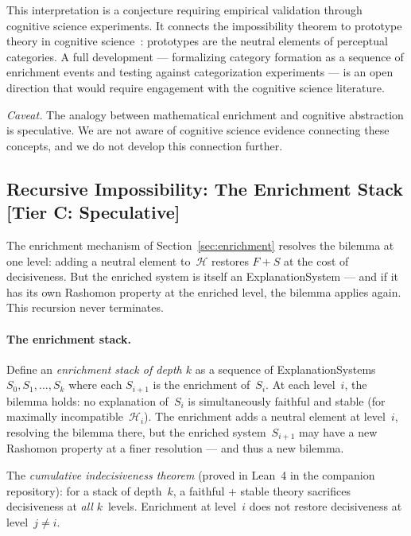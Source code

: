 \documentclass[11pt,a4paper]{article}
\newcommand{\sH}{\mathcal{H}}
\begin{document}
This interpretation is a conjecture requiring empirical validation through cognitive science experiments.  It connects the impossibility theorem to prototype
theory in cognitive science~\citep{rosch1975cognitive}: prototypes are
the neutral elements of perceptual categories.  A full development ---
formalizing category formation as a sequence of enrichment events and
testing against categorization experiments --- is an open direction that
would require engagement with the cognitive science literature.

\smallskip\noindent\emph{Caveat.} The analogy between mathematical enrichment and cognitive abstraction is speculative. We are not aware of cognitive science evidence connecting these concepts, and we do not develop this connection further.

\subsection{Recursive Impossibility: The Enrichment Stack\,\textnormal{\normalsize[Tier C: Speculative]}}
\label{sec:recursive}

The enrichment mechanism of Section~\ref{sec:enrichment} resolves the bilemma at one level: adding a neutral element to~$\sH$ restores $F+S$ at the cost of decisiveness. But the enriched system is itself an ExplanationSystem --- and if it has its own Rashomon property at the enriched level, the bilemma applies again. This recursion never terminates.

\paragraph{The enrichment stack.}
Define an \emph{enrichment stack of depth $k$} as a sequence of ExplanationSystems $S_0, S_1, \ldots, S_k$ where each $S_{i+1}$ is the enrichment of~$S_i$. At each level~$i$, the bilemma holds: no explanation of~$S_i$ is simultaneously faithful and stable (for maximally incompatible~$\sH_i$). The enrichment adds a neutral element at level~$i$, resolving the bilemma there, but the enriched system~$S_{i+1}$ may have a new Rashomon property at a finer resolution --- and thus a new bilemma.

The \emph{cumulative indecisiveness theorem} (proved in Lean~4 in the companion repository): for a stack of depth~$k$, a faithful + stable theory sacrifices decisiveness at \emph{all} $k$~levels. Enrichment at level~$i$ does not restore decisiveness at level~$j \neq i$.
\end{document}
